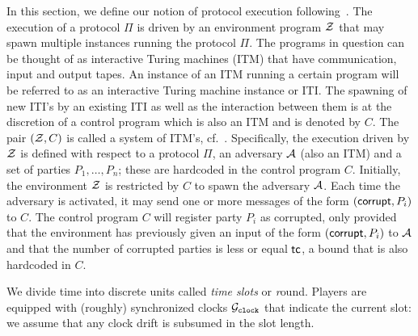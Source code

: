 In this section, we define our notion of protocol execution following~\cite{EC:GarKiaLeo15,FOCS:Canetti01}.
The execution of a protocol $\Pi$ is driven by an
environment program $\mathcal{Z}$ that may spawn multiple instances running the protocol $\Pi$. The programs
in question can be thought of as interactive Turing machines (ITM) that have communication,
input and output tapes. An instance of an ITM running a certain program will be referred to as
an interactive Turing machine instance or ITI. The spawning of new ITI's by an existing ITI as
well as the interaction between them is at the discretion of a control program which is also an ITM
and is denoted by $C$. The pair $(\mathcal{Z}, C)$ is called a system of ITM's, cf.~\cite{FOCS:Canetti01}.
Specifically, the execution driven by $\mathcal{Z}$ is defined with respect to a protocol $\Pi$, an adversary $\mathcal{A}$
(also an ITM) and a set of parties $P_1,\dots,P_n$; these are hardcoded in the control program $C$.
Initially, the environment $\mathcal{Z}$ is restricted by $C$ to spawn the adversary $\mathcal{A}$. Each time the
adversary is activated, it may send one or more messages of the form $(\mathsf{corrupt}, P_i)$ to $C$. The control
program $C$ will register party $P_i$ as corrupted, only provided that the environment has previously
given an input of the form $(\mathsf{corrupt}, P_i)$ to $\mathcal{A}$ and that the number of corrupted parties is less or
equal $\mathsf{tc}$, a bound that is also hardcoded in $C$.

We divide time into discrete units called \emph{time slots} or {\emph round}. Players are equipped with (roughly)
synchronized clocks $\mathcal{G}_{\mathtt{clock}}$ that indicate the current slot: we assume that any clock drift is subsumed in the slot
length.


